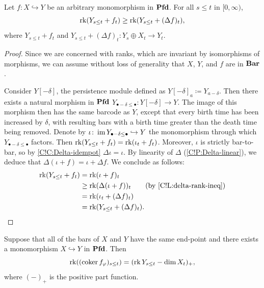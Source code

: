 \begin{lemma}
\label{C!L:coker-rank-ineq}
  Let $f \colon X \hookrightarrow Y$ be an arbitrary monomorphism in $\Pfd$. For all $s \leq t$ in $[0, \infty)$,
  \[
    \rk(Y_{s \leq t} + f_t) \geq \rk(Y_{s \leq t} + (\Delta f)_t),
  \]
  where $Y_{s \leq t} + f_t$ and $Y_{s \leq t} + (\Delta f)_t \colon Y_s \oplus X_t \to Y_t$.
\end{lemma}

\begin{proof}
  Since we are concerned with ranks, which are invariant by isomorphisms of morphisms, we can assume without loss of generality that $X$, $Y$, and $f$ are in $\Bar$.

  Consider $Y[-\delta]$, the persistence module defined as $Y[-\delta]_a \coloneq Y_{a - \delta}$. Then there exists a natural morphism in $\Pfd$ $Y_{\bullet - \delta \leq \bullet} \colon Y[-\delta] \to Y$.
  The image of this morphism then has the same barcode as $Y$, except that every birth time has been increased by $\delta$, with resulting bars with a birth time greater than the death time being removed. Denote by $\iota \colon \im Y_{\bullet - \delta \leq \bullet} \hookrightarrow Y$ the monomorphism through which $Y_{\bullet - \delta \leq \bullet}$ factors. Then $\rk(Y_{s \leq t} + f_t) = \rk(\iota_t + f_t)$. Moreover, $\iota$ is strictly bar-to-bar, so by \cref{C!C:Delta-idempot} $\Delta \iota = \iota$.
  By linearity of $\Delta$ (\cref{C!P:Delta-linear}), we deduce that $\Delta(\iota + f) = \iota + \Delta f$. We conclude as follows:
  \begin{align*}
    \rk(Y_{s \leq t} + f_t) & = \rk(\iota + f)_t \\
    & \geq \rk(\Delta(\iota + f))_t \tag{by \cref{C!L:delta-rank-ineq}}\\
    & = \rk(\iota_t + (\Delta f)_t) \\
    & = \rk(Y_{s \leq t} + (\Delta f)_t). \qedhere
  \end{align*}
\end{proof}

\begin{lemma}
\label{C!L:canonical-coker}
  Suppose that all of the bars of $X$ and $Y$ have the same end-point and there exists a monomorphism $X\hookrightarrow Y$ in $\Pfd$. Then
  \[
    \rk((\coker f_\varphi)_{s \leq t}) = (\rk Y_{s \leq t} - \dim X_t)_+,
  \]
  where $(-)_+$ is the positive part function.
\end{lemma}

